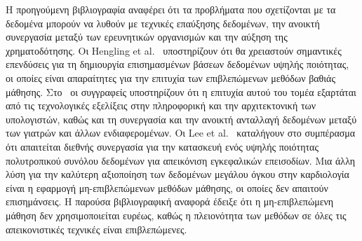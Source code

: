 Η προηγούμενη βιβλιογραφία αναφέρει ότι τα προβλήματα που σχετίζονται με τα δεδομένα μπορούν να λυθούν με τεχνικές επαύξησης δεδομένων, την ανοικτή συνεργασία μεταξύ των ερευνητικών οργανισμών και την αύξηση της χρηματοδότησης.
Οι Hengling et al.~\cite{henglin2017machine} υποστηρίζουν ότι θα χρειαστούν σημαντικές επενδύσεις για τη δημιουργία επισημασμένων βάσεων δεδομένων υψηλής ποιότητας, οι οποίες είναι απαραίτητες για την επιτυχία των επιβλεπώμενων μεθόδων βαθιάς μάθησης.
Στο~\cite{austin2016application} οι συγγραφείς υποστηρίζουν ότι η επιτυχία αυτού του τομέα εξαρτάται από τις τεχνολογικές εξελίξεις στην πληροφορική και την αρχιτεκτονική των υπολογιστών, καθώς και τη συνεργασία και την ανοικτή ανταλλαγή δεδομένων μεταξύ των γιατρών και άλλων ενδιαφερομένων.
Οι Lee et al.~\cite{lee2017deepb} καταλήγουν στο συμπέρασμα ότι απαιτείται διεθνής συνεργασία για την κατασκευή ενός υψηλής ποιότητας πολυτροπικού συνόλου δεδομένων για απεικόνιση εγκεφαλικών επεισοδίων.
Μια άλλη λύση για την καλύτερη αξιοποίηση των δεδομένων μεγάλου όγκου στην καρδιολογία είναι η εφαρμογή μη-επιβλεπώμενων μεθόδων μάθησης, οι οποίες δεν απαιτούν επισημάνσεις.
Η παρούσα βιβλιογραφική αναφορά έδειξε ότι η μη-επιβλεπώμενη μάθηση δεν χρησιμοποιείται ευρέως, καθώς η πλειονότητα των μεθόδων σε όλες τις απεικονιστικές τεχνικές είναι επιβλεπώμενες.


